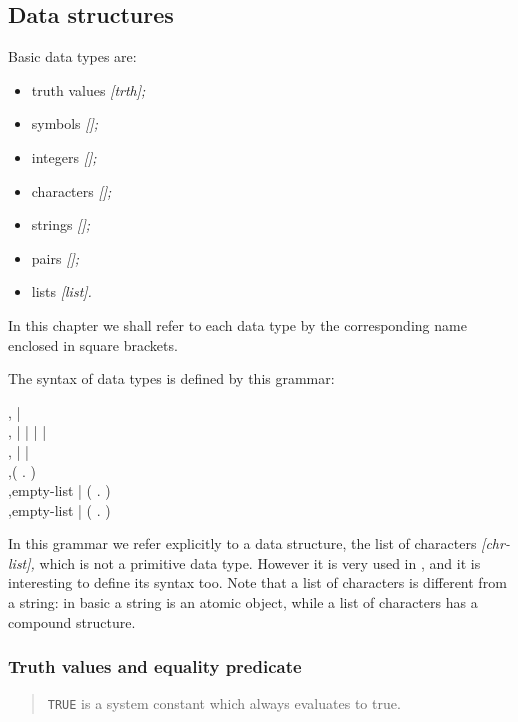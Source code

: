 \subsection{Data structures}

Basic {\HG} data types are:

\begin{itemize}
	\item truth values {\it [trth];}
	\item symbols {\it [\sym];}
	\item integers {\it [\inte];}
	\item characters {\it [\chr];}
	\item strings {\it [\str];}
	\item pairs {\it [\pair];}
	\item lists {\it [list].}
\end{itemize}

In this chapter we shall refer to each data type by the corresponding name
enclosed in square brackets.

The syntax of data types is defined by this grammar:

\begin{bnf}
				\sep  {} |  \\
		\sep  {} |  |  |  |  \\
	\sep  {} |  | \\
		    \sep  ( \T{obj} . ) \\
			\sep  empty-list | (  .  ) \\
		\sep  empty-list | (  .  )
\end{bnf}

In this grammar we refer explicitly to a data structure, the list of characters
{\it [chr-list],} which is not a primitive data type.
However it is very used in {\HG}, and it is interesting to define its syntax too.
Note that a list of characters is different from a string: in basic {\HG} a
string is an atomic object, while a list of characters has a compound structure.


\subsubsection{Truth values and equality predicate}

\begin{quote}
	{\tt TRUE} is a system constant which always evaluates to true.
\end{quote}

